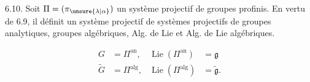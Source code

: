 6.10. Soit $\Pi=(\pi_{\unsure{\lambda|\alpha}})$ un système projectif  de groupes profinis. En vertu de 6.9, il définit un système projectif  de systèmes projectifs  de groupes analytiques, groupes algébriques, Alg. de Lie et Alg. de Lie algébriques.

\[
\begin{aligned}
G&=\Pi^{\mathrm{an}},&\operatorname{Lie}(\Pi^{\mathrm{an}})&=\mathfrak g\\
\widetilde G&=\Pi^{\mathrm{alg}},&\operatorname{Lie}(\Pi^{\mathrm{alg}})&=\widetilde{\mathfrak g}.
\end{aligned}
\]
